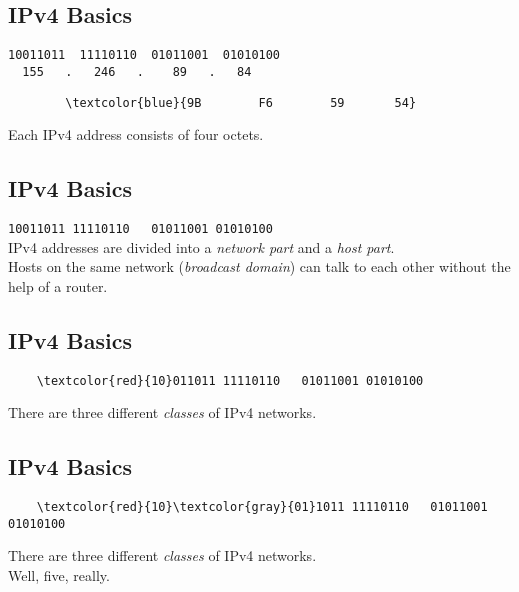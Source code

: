\documentclass[xga]{xdvislides}
\begin{document}
\subsection{IPv4 Basics}
\vspace{.5in}
\Hugesize
\begin{center}
\verb|10011011  11110110  01011001  01010100| \\

\verb|  155   .   246   .    89   .   84| \\


\begin{Verbatim}
        \textcolor{blue}{9B        F6        59       54}
\end{Verbatim}
\vspace{.5in}
Each IPv4 address consists of four octets.
\end{center}
\Normalsize


\subsection{IPv4 Basics}
\vspace{.5in}
\Hugesize
\begin{center}
\verb|10011011 11110110   01011001 01010100| \\
\vspace{.5in}
IPv4 addresses are divided into a {\em network part} and a {\em host part}. \\
\vspace{.25in}
Hosts on the same network ({\em broadcast domain}) can talk to each other
without the help of a router.
\end{center}
\Normalsize

\subsection{IPv4 Basics}
\vspace{.5in}
\Hugesize
\begin{center}
\begin{Verbatim}
    \textcolor{red}{10}011011 11110110   01011001 01010100
\end{Verbatim}
\vspace{.5in}
There are three different {\em classes} of IPv4 networks.
\end{center}
\Normalsize

\subsection{IPv4 Basics}
\vspace{.5in}
\Hugesize
\begin{center}
\begin{Verbatim}
    \textcolor{red}{10}\textcolor{gray}{01}1011 11110110   01011001 01010100
\end{Verbatim}
\vspace{.5in}
There are three different {\em classes} of IPv4 networks. \\
Well, five, really.
\end{center}
\Normalsize
\end{document}
